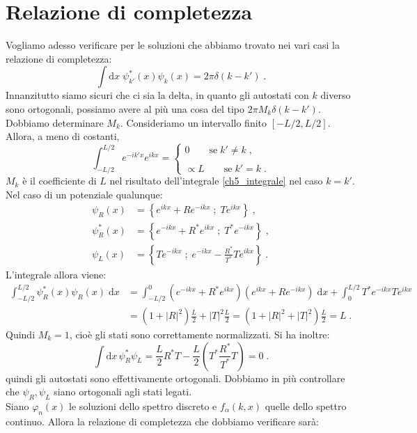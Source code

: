 \documentclass[12pt,a4paper]{report}
\theoremstyle{definition}
\numberwithin{equation}{section}
\newcommand{\diff}[1][]{\mathrm{d}#1}
\begin{document}
\section{Relazione di completezza}
Vogliamo adesso verificare per le soluzioni che abbiamo trovato nei vari casi la relazione di completezza:
\begin{equation}
\int\diff{x}\; \psi_{k'}^*(x)\psi_k(x)=2\pi\delta(k-k')\;.
\end{equation}
Innanzitutto siamo sicuri che ci sia la delta, in quanto gli autostati con $k$ diverso sono ortogonali, possiamo avere al più una cosa del tipo $2\pi M_k\delta(k-k')$. Dobbiamo determinare $M_k$. Consideriamo un intervallo finito $[-L/2,L/2]$. Allora, a meno di costanti,
\begin{equation}
\int_{-L/2}^{L/2} e^{-ik'x}e^{ikx}=
\begin{cases}
0\qquad \mbox{se}\; k'\ne k\;, \\
\\
\propto L\qquad \mbox{se}\; k'=k\;.
\end{cases} \label{ch5_integrale}
\end{equation}
$M_k$ è il coefficiente di $L$ nel risultato dell'integrale \eqref{ch5_integrale} nel caso $k=k'$. Nel caso di un potenziale qualunque:
\begin{align*}
\psi_R(x)&=\left\{ e^{ikx}+Re^{-ikx}\; ;\; Te^{ikx}\right\}\;, \\
\psi^*_R(x) &= \left\{ e^{-ikx}+R^*e^{ikx}\; ; \; T^*e^{-ikx}\right\}\;, \\
\psi_L(x) &= \left\{ Te^{-ikx} \; ; \; e^{-ikx}-\frac{R^*}{T^*}T e^{ikx}\right\}\;.
\end{align*}
L'integrale allora viene:
\begin{align*}
\int_{-L/2}^{L/2} \psi^*_R(x)\psi_R(x)\;\diff{x}&=\int_{-L/2}^0 (e^{-ikx}+R^*e^{ikx})(e^{ikx}+Re^{-ikx})\;\diff{x}+
\int_0^{L/2} T^*e^{-ikx}Te^{ikx} \\
&= (1+|R|^2)\frac{L}{2}+|T|^2\frac{L}{2}=(1+|R|^2+|T|^2)\frac{L}{2}=L\;.
\end{align*}
Quindi $M_k=1$, cioè gli stati sono correttamente normalizzati. Si ha inoltre:
\begin{equation}
\int\diff{x}\,\psi_R^*\psi_L= \frac{L}{2}R^*T-\frac{L}{2}\left(T^*\frac{R^*}{T^*}T\right)=0\;.
\end{equation}
quindi gli autostati sono effettivamente ortogonali. Dobbiamo in più controllare che $\psi_R,\psi_L$ siano ortogonali agli stati legati. \\
Siano $\varphi_n(x)$ le soluzioni dello spettro discreto e $f_{\alpha}(k,x)$ quelle dello spettro continuo. Allora la relazione di completezza che dobbiamo verificare sarà:
\end{document}
